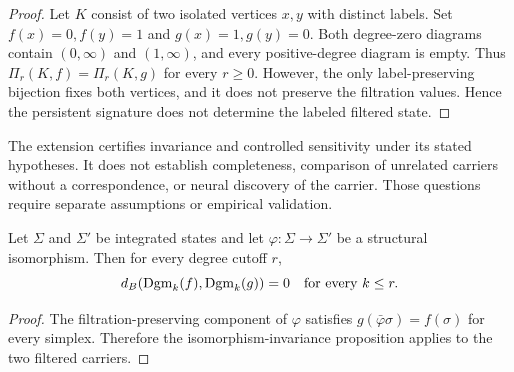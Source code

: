 \begin{proof}
Let $K$ consist of two isolated vertices $x,y$ with distinct labels. Set
$f(x)=0,f(y)=1$ and $g(x)=1,g(y)=0$. Both degree-zero diagrams contain
$(0,\infty)$ and $(1,\infty)$, and every positive-degree diagram is empty.
Thus $\Pi_r(K,f)=\Pi_r(K,g)$ for every $r\geq0$. However, the only
label-preserving bijection fixes both vertices, and it does not preserve the
filtration values. Hence the persistent signature does not determine the
labeled filtered state.
\end{proof}


The extension certifies invariance and controlled sensitivity under its stated
hypotheses. It does not establish completeness, comparison of unrelated
carriers without a correspondence, or neural discovery of the carrier. Those
questions require separate assumptions or empirical validation.


\begin{proposition}
Let $\Sigma$ and $\Sigma'$ be integrated states and let
$\varphi:\Sigma\to\Sigma'$ be a structural isomorphism. Then for every
degree cutoff $r$,
\[
d_B(\operatorname{Dgm}_k(f),\operatorname{Dgm}_k(g))=0\quad\text{for every }k\leq r.
\]
\end{proposition}

\begin{proof}
The filtration-preserving component of $\varphi$ satisfies
$g(\bar\varphi\sigma)=f(\sigma)$ for every simplex. Therefore the
isomorphism-invariance proposition applies to the two filtered carriers.
\end{proof}
